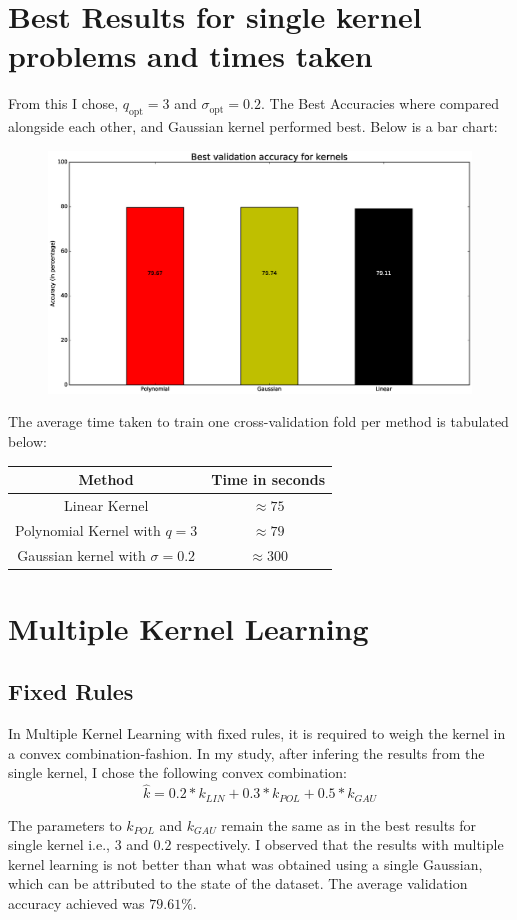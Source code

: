 \documentclass{article}
\begin{document}
\section*{Best Results for single kernel problems and times taken}
\begin{flushleft}
From this I chose, \(q_{\text{opt}} = 3\) and \(\sigma_{\text{opt}} = 0.2\). The Best Accuracies where compared alongside each other, and Gaussian kernel performed best. Below is a bar chart:
\begin{figure}[H]
\centering
\includegraphics[width=0.5\linewidth]{./images/comparison_3.eps}
\end{figure}

The average time taken to train one cross-validation fold per method is tabulated below:

\begin{center}
\begin{tabular}{|c|c|}
\hline
Method & Time in seconds \\
\hline
\hline
Linear Kernel & \(\approx 75\) \\
\hline
Polynomial Kernel with \(q = 3\) & \(\approx 79\) \\
\hline
Gaussian kernel with \(\sigma = 0.2\) & \(\approx 300\) \\
\hline
\end{tabular}
\end{center}
\end{flushleft}

\section*{Multiple Kernel Learning}
\subsection*{Fixed Rules}
\begin{flushleft}
In Multiple Kernel Learning with fixed rules, it is required to weigh the kernel in a convex combination-fashion. In my study, after infering the results from the single kernel, I chose the following convex combination:
\begin{equation*}
\hat{k} = 0.2*k_{LIN} + 0.3*k_{POL} + 0.5*k_{GAU}
\end{equation*}

The parameters to \(k_{POL}\) and \(k_{GAU}\) remain the same as in the best results for single kernel i.e., \(3\) and \(0.2\) respectively. I observed that the results with multiple kernel learning is not better than what was obtained using a single Gaussian, which can be attributed to the state of the dataset. The average validation accuracy achieved was \(79.61\%\). 
\end{flushleft}
\end{document}
